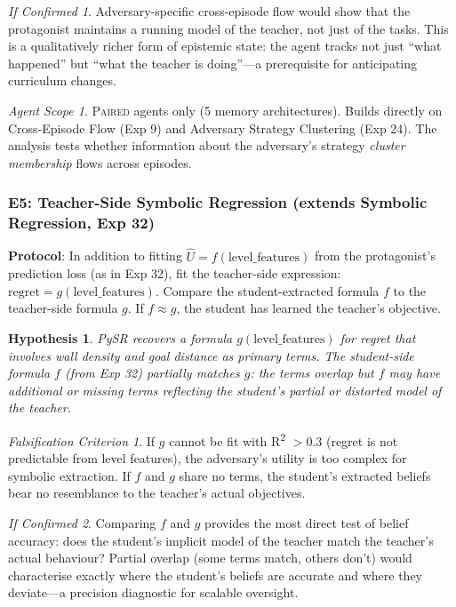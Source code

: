 \documentclass[11pt,a4paper]{article}
\newtheorem{hypothesis}{Hypothesis}[subsection]
\theoremstyle{remark}
\newtheorem*{falsification}{Falsification Criterion}
\newtheorem*{implication}{If Confirmed}
\newtheorem*{agentscope}{Agent Scope}
\newcommand{\paired}{\textsc{Paired}}
\newcommand{\Uhat}{\hat{U}}
\begin{document}
\begin{implication}
Adversary-specific cross-episode flow would show that the protagonist maintains a running model of the teacher, not just of the tasks. This is a qualitatively richer form of epistemic state: the agent tracks not just ``what happened'' but ``what the teacher is doing''---a prerequisite for anticipating curriculum changes.
\end{implication}

\begin{agentscope}
\paired{} agents only (5 memory architectures). Builds directly on Cross-Episode Flow (Exp 9) and Adversary Strategy Clustering (Exp 24). The analysis tests whether information about the adversary's strategy \textit{cluster membership} flows across episodes.
\end{agentscope}

\subsubsection{E5: Teacher-Side Symbolic Regression (extends Symbolic Regression, Exp 32)}
\label{exp:e5}

\textbf{Protocol}: In addition to fitting $\Uhat = f(\text{level\_features})$ from the protagonist's prediction loss (as in Exp 32), fit the teacher-side expression: $\text{regret} = g(\text{level\_features})$. Compare the student-extracted formula $f$ to the teacher-side formula $g$. If $f \approx g$, the student has learned the teacher's objective.

\begin{hypothesis}
PySR recovers a formula $g(\text{level\_features})$ for regret that involves wall density and goal distance as primary terms. The student-side formula $f$ (from Exp 32) partially matches $g$: the terms overlap but $f$ may have additional or missing terms reflecting the student's partial or distorted model of the teacher.
\end{hypothesis}

\begin{falsification}
If $g$ cannot be fit with R\textsuperscript{2} $> 0.3$ (regret is not predictable from level features), the adversary's utility is too complex for symbolic extraction. If $f$ and $g$ share no terms, the student's extracted beliefs bear no resemblance to the teacher's actual objectives.
\end{falsification}

\begin{implication}
Comparing $f$ and $g$ provides the most direct test of belief accuracy: does the student's implicit model of the teacher match the teacher's actual behaviour? Partial overlap (some terms match, others don't) would characterise exactly where the student's beliefs are accurate and where they deviate---a precision diagnostic for scalable oversight.
\end{implication}
\end{document}
